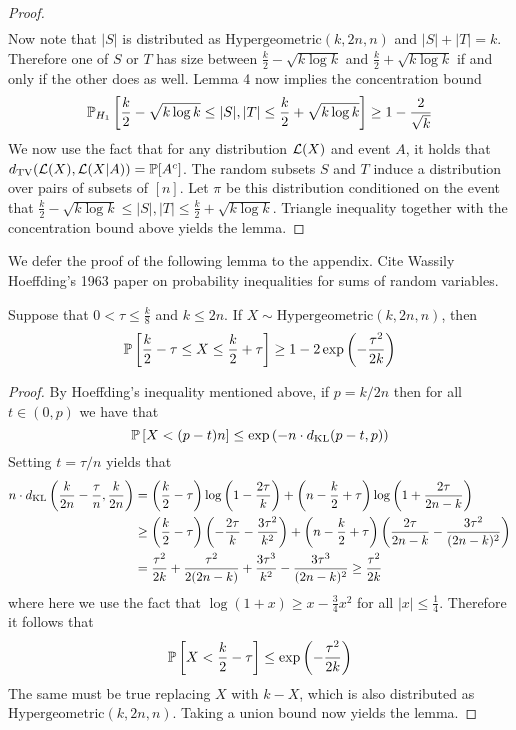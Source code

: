 \documentclass[11pt]{article}
\begin{document}
\begin{proof}
\begin{align*}
\end{align*}
Now note that $|S|$ is distributed as $\text{Hypergeometric}(k, 2n, n)$ and $|S| + |T| = k$. Therefore one of $S$ or $T$ has size between $\frac{k}{2} - \sqrt{k \log k}$ and $\frac{k}{2} + \sqrt{k \log k}$ if and only if the other does as well. Lemma 4 now implies the concentration bound
$$\mathbb{P}_{H_1} \left[ \frac{k}{2} - \sqrt{k \log k} \le |S|, |T| \le \frac{k}{2} + \sqrt{k \log k} \right] \ge 1 - \frac{2}{\sqrt{k}}$$
We now use the fact that for any distribution $\mathcal{L}(X)$ and event $A$, it holds that $d_{\text{TV}}(\mathcal{L}(X), \mathcal{L}(X|A)) = \mathbb{P}[A^c]$. The random subsets $S$ and $T$ induce a distribution over pairs of subsets of $[n]$. Let $\pi$ be this distribution conditioned on the event that $\frac{k}{2} - \sqrt{k \log k} \le |S|, |T| \le \frac{k}{2} + \sqrt{k \log k}$. Triangle inequality together with the concentration bound above yields the lemma.
\end{proof}

We defer the proof of the following lemma to the appendix. Cite Wassily Hoeffding's 1963 paper on probability inequalities for sums of random variables.

\begin{lemma}
Suppose that $0 < \tau \le \frac{k}{8}$ and $k \le 2n$. If $X \sim \text{Hypergeometric}(k, 2n, n)$, then
$$\mathbb{P}\left[ \frac{k}{2} - \tau \le X \le \frac{k}{2} + \tau \right] \ge 1 - 2\exp\left( - \frac{\tau^2}{2k} \right)$$
\end{lemma}

\begin{proof}
By Hoeffding's inequality mentioned above, if $p = k/2n$ then for all $t \in (0, p)$ we have that
$$\mathbb{P}\left[ X < (p - t)n \right] \le \exp\left( - n \cdot d_{\text{KL}}(p - t, p) \right)$$
Setting $t = \tau/n$ yields that
\begin{align*}
n \cdot d_{\text{KL}}\left( \frac{k}{2n} - \frac{\tau}{n}, \frac{k}{2n} \right) &= \left( \frac{k}{2} - \tau \right) \log \left( 1 - \frac{2\tau}{k} \right) + \left( n - \frac{k}{2} + \tau \right) \log \left( 1 + \frac{2\tau}{2n - k}\right) \\
&\ge \left( \frac{k}{2} - \tau \right) \left( - \frac{2\tau}{k} - \frac{3\tau^2}{k^2} \right) + \left( n - \frac{k}{2} + \tau \right) \left( \frac{2\tau}{2n - k} - \frac{3\tau^2}{(2n - k)^2}\right) \\
&= \frac{\tau^2}{2k} + \frac{\tau^2}{2(2n - k)} + \frac{3\tau^3}{k^2} - \frac{3\tau^3}{(2n - k)^2} \ge \frac{\tau^2}{2k}
\end{align*}
where here we use the fact that $\log(1 + x) \ge x - \frac{3}{4} x^2$ for all $|x| \le \frac{1}{4}$. Therefore it follows that
$$\mathbb{P}\left[ X < \frac{k}{2} - \tau \right] \le \exp\left( - \frac{\tau^2}{2k} \right)$$
The same must be true replacing $X$ with $k - X$, which is also distributed as $\text{Hypergeometric}(k, 2n, n)$. Taking a union bound now yields the lemma.
\end{proof}
\end{document}
